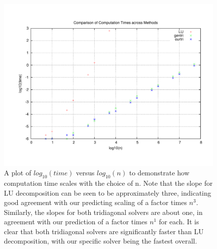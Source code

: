 \documentclass[11pt,a4paper]{article}
\begin{document}
\begin{figure}
\centering
\includegraphics[width=1.0\textwidth]{comparisontime.pdf}
\caption{A plot of $log_{10}(time)$ versus $log_{10}(n)$ to demonstrate how computation time scales with the choice of n. Note that the slope for LU decomposition can be seen to be approximately three, indicating good agreement with our predicting scaling of a factor times $n^3$. Similarly, the slopes for both tridiagonal solvers are about one, in agreement with our prediction of a factor times $n^1$ for each. It is clear that both tridiagonal solvers are significantly faster than LU decomposition, with our specific solver being the fastest overall.}
\end{figure}
\end{document}
